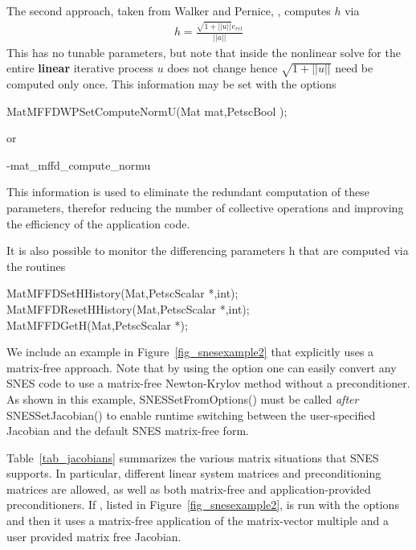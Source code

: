 The second approach, taken from Walker and Pernice, \cite{pw98}, computes $ h $ via
\begin{eqnarray*}
        h = \frac{\sqrt{1 + ||u||}e_{rel}}{||a||}
\end{eqnarray*}
This has no tunable parameters, but note that inside the nonlinear solve for
the entire {\bf linear} iterative process $ u $ does not change hence
$\sqrt{1 + ||u||} $ need be computed only once. This information may be set with the
options
\begin{tabbing}
  MatMFFDWPSetComputeNormU(Mat mat,PetscBool );
\end{tabbing}
or
\begin{tabbing}
   -mat\_mffd\_compute\_normu 
\end{tabbing}
This information is used to eliminate the redundant computation of these parameters,
therefor reducing the number of collective operations and improving the efficiency of the
         application code.

It is also possible to monitor the differencing parameters h that are computed
via the routines
\begin{tabbing}
   MatMFFDSetHHistory(Mat,PetscScalar *,int);\\
   MatMFFDResetHHistory(Mat,PetscScalar *,int);\\
   MatMFFDGetH(Mat,PetscScalar *);\\
\end{tabbing}

We include an example in Figure~\ref{fig_snesexample2} that explicitly
uses a matrix-free approach.  Note that by using the option
 one can easily convert any SNES code to use a matrix-free
Newton-Krylov method without a preconditioner.  As shown in this
example, SNESSetFromOptions() must be called {\em after}
SNESSetJacobian() to enable runtime switching between the
user-specified Jacobian and the default SNES matrix-free form.

Table~\ref{tab_jacobians} summarizes the various matrix situations
that SNES supports.  In particular, different linear system matrices
and preconditioning matrices are allowed, as well as both matrix-free
and application-provided preconditioners.  If
,
 listed in Figure~\ref{fig_snesexample2}, is run with the options  and  then it uses a matrix-free application of the matrix-vector multiple and a user provided matrix free Jacobian.

